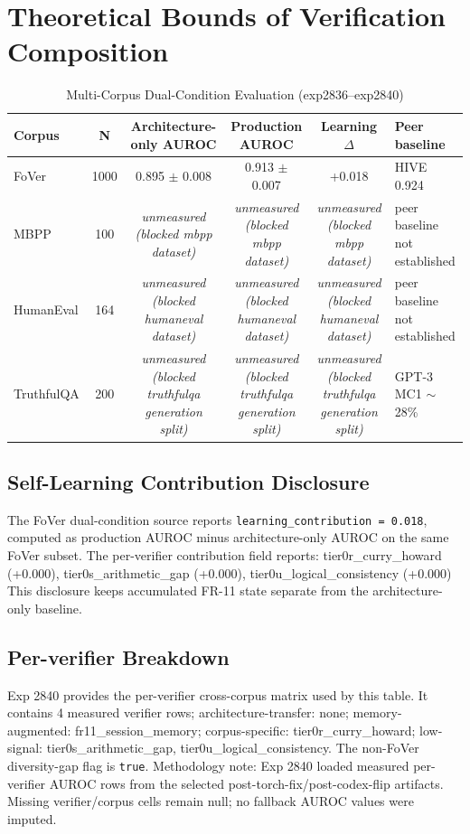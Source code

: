 \documentclass[10pt]{article}
\begin{document}
\section{Theoretical Bounds of Verification Composition}
\label{sec:bounds}


\begin{table}[h]
\centering
\caption{Multi-Corpus Dual-Condition Evaluation (exp2836--exp2840)}
\label{tab:multi_corpus}
\begin{tabular}{l c c c c l}
\toprule
Corpus & N & Architecture-only AUROC & Production AUROC & Learning $\Delta$ & Peer baseline \\
\midrule
FoVer & 1000 & 0.895 $\pm$ 0.008 & 0.913 $\pm$ 0.007 & +0.018 & HIVE 0.924 \\
MBPP & 100 & \emph{unmeasured (blocked mbpp dataset)} & \emph{unmeasured (blocked mbpp dataset)} & \emph{unmeasured (blocked mbpp dataset)} & peer baseline not established \\
HumanEval & 164 & \emph{unmeasured (blocked humaneval dataset)} & \emph{unmeasured (blocked humaneval dataset)} & \emph{unmeasured (blocked humaneval dataset)} & peer baseline not established \\
TruthfulQA & 200 & \emph{unmeasured (blocked truthfulqa generation split)} & \emph{unmeasured (blocked truthfulqa generation split)} & \emph{unmeasured (blocked truthfulqa generation split)} & GPT-3 MC1 $\sim$28\% \\
\bottomrule
\end{tabular}
\end{table}

\subsection{Self-Learning Contribution Disclosure}
\label{sec:self_learning_disclosure}
The FoVer dual-condition source reports \texttt{learning\_contribution = 0.018}, computed as production AUROC minus architecture-only AUROC on the same FoVer subset. The per-verifier contribution field reports: tier0r\_curry\_howard (+0.000), tier0s\_arithmetic\_gap (+0.000), tier0u\_logical\_consistency (+0.000) This disclosure keeps accumulated FR-11 state separate from the architecture-only baseline.

\subsection{Per-verifier Breakdown}
\label{sec:per_verifier_breakdown}
Exp 2840 provides the per-verifier cross-corpus matrix used by this table. It contains 4 measured verifier rows; architecture-transfer: none; memory-augmented: fr11\_session\_memory; corpus-specific: tier0r\_curry\_howard; low-signal: tier0s\_arithmetic\_gap, tier0u\_logical\_consistency. The non-FoVer diversity-gap flag is \texttt{true}. Methodology note: Exp 2840 loaded measured per-verifier AUROC rows from the selected post-torch-fix/post-codex-flip artifacts. Missing verifier/corpus cells remain null; no fallback AUROC values were imputed.
\end{document}
